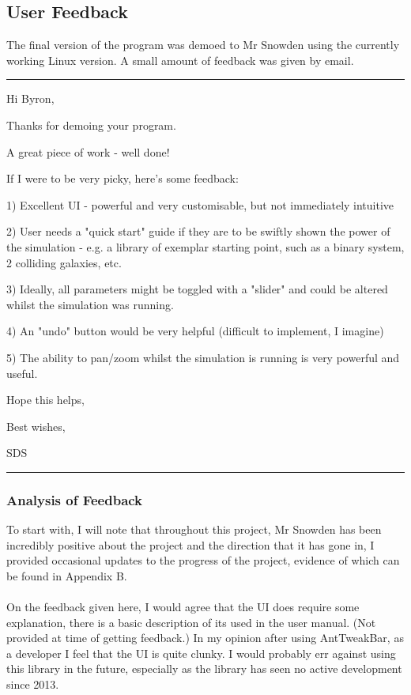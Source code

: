 \pagebreak

\subsection{User Feedback}
The final version of the program was demoed to Mr Snowden using the currently working Linux version. A small amount of feedback was given by email. \\
\hrule
\begin{small}
{\parskip=10pt 

Hi Byron,

Thanks for demoing your program.

A great piece of work - well done!
 
If I were to be very picky, here's some feedback:

1) Excellent UI - powerful and very customisable, but not immediately intuitive

2) User needs a "quick start" guide if they are to be swiftly shown the power of the simulation - e.g. a library of exemplar starting point, such as a binary system, 2 colliding galaxies, etc.

3) Ideally, all parameters might be toggled with a "slider" and could be altered whilst the simulation was running.

4) An "undo" button would be very helpful (difficult to implement, I imagine)

5) The ability to pan/zoom whilst the simulation is running is very powerful and useful.
 
Hope this helps,

Best wishes,

SDS \\
}
\hrule
\end{small}
\subsubsection{Analysis of Feedback}
To start with, I will note that throughout this project, Mr Snowden has been incredibly positive about the project and the direction that it has gone in, I provided occasional updates to the progress of the project, evidence of which can be found in Appendix B.

\paragraph{}
On the feedback given here, I would agree that the UI does require some explanation, there is a basic description of its used in the user manual. (Not provided at time of getting feedback.) In my opinion after using AntTweakBar, as a developer I feel that the UI is quite clunky. I would probably err against using this library in the future, especially as the library has seen no active development since 2013.

